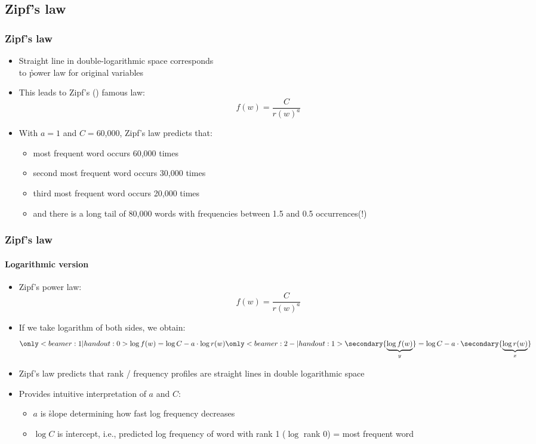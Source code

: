 \documentclass[t]{beamer} %
\begin{document}
\subsection{Zipf's law}

\begin{frame}
  \frametitle{Zipf's law}

\begin{itemize}
\item Straight line in double-logarithmic space corresponds\\
  to \h{power law} for original variables
\item This leads to Zipf's (\citeyear{Zipf:49,Zipf:65}) famous law:
    \[
    f(w)=\frac{C}{r(w)^a}
    \]
    \pause
  \item With $a=1$ and $C=$60,000, Zipf's law predicts that:
    \begin{itemize}
    \item most frequent word occurs 60,000 times
    \item second most frequent word occurs 30,000 times
    \item third most frequent word occurs 20,000 times
    \item and there is a long tail of 80,000 words with frequencies between
      1.5 and 0.5 occurrences(!)
    \end{itemize}
  \end{itemize}

\end{frame}

\begin{frame}
  \frametitle{Zipf's law}\framesubtitle{Logarithmic version}

  \begin{itemize}
  \item Zipf's power law:
    \[
    f(w)=\frac{C}{r(w)^a}
    \]
  \item If we take logarithm of both sides, we obtain:
    \[
    \only<beamer:1| handout:0>{%
      \log f(w)= \log C - a \cdot \log r(w)}%
    \only<beamer:2-| handout:1>{%
      \secondary{\underbrace{\log f(w)}_y}
      = \log C - a \cdot \secondary{\underbrace{\log r(w)}_x}}%
    \]
  \item<2-> Zipf's law predicts that rank / frequency profiles are
    straight lines in double logarithmic space
  \item<3-> Provides intuitive interpretation of $a$ and $C$:
    \begin{itemize}
    \item $a$ is \h{slope} determining how fast log frequency decreases
    \item $\log C$ is \h{intercept}, i.e., predicted log frequency of word
      with rank 1 ($\log$ rank 0) = most frequent word
    \end{itemize}
  \end{itemize}
\end{frame}
\end{document}
